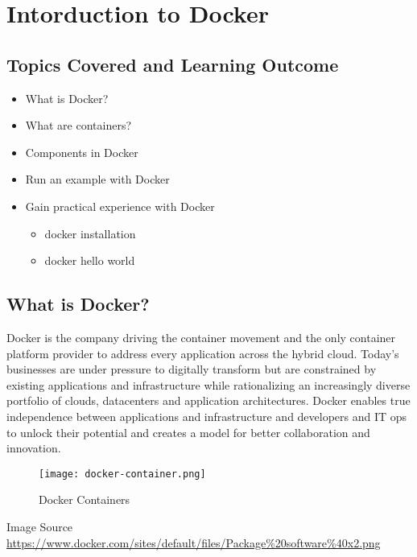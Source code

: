 \section{Intorduction to Docker}
\label{Docker}


\subsection{Topics Covered and Learning Outcome}

\begin{itemize}

\item What is Docker?
\item What are containers?
\item Components in Docker
\item Run an example with Docker
\item Gain practical experience with Docker

  \begin{itemize}
  \item docker installation
  \item docker hello world
  \end{itemize}

\end{itemize}

\subsection{What is Docker?}

Docker is the company driving the container movement and the only
container platform provider to address every application across the
hybrid cloud. Today's businesses are under pressure to digitally
transform but are constrained by existing applications and
infrastructure while rationalizing an increasingly diverse portfolio of
clouds, datacenters and application architectures. Docker enables true
independence between applications and infrastructure and developers and
IT ops to unlock their potential and creates a model for better
collaboration and innovation.

\begin{figure}[htbp]
\centering
\texttt{[image: docker-container.png]}
\caption{Docker Containers}
\end{figure}

Image Source
\url{https://www.docker.com/sites/default/files/Package\%20software\%40x2.png}

